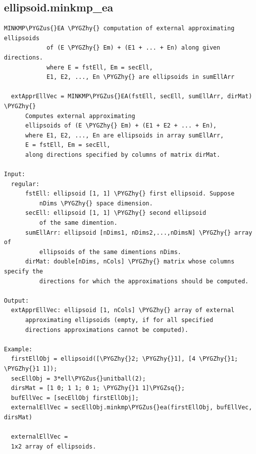 \documentclass[letterpaper,10pt,english]{sphinxmanual}
\def\PYGZus{\char`\_}
\def\PYGZhy{\char`\-}
\def\PYGZsq{\char`\'}
\begin{document}
\subsection{ellipsoid.minkmp\_ea}
\label{chap_functions:ellipsoid-minkmp-ea}
\begin{Verbatim}[commandchars=\\\{\}]
MINKMP\PYGZus{}EA \PYGZhy{} computation of external approximating ellipsoids
            of (E \PYGZhy{} Em) + (E1 + ... + En) along given directions.
            where E = fstEll, Em = secEll,
            E1, E2, ..., En \PYGZhy{} are ellipsoids in sumEllArr

  extApprEllVec = MINKMP\PYGZus{}EA(fstEll, secEll, sumEllArr, dirMat) \PYGZhy{}
      Computes external approximating
      ellipsoids of (E \PYGZhy{} Em) + (E1 + E2 + ... + En),
      where E1, E2, ..., En are ellipsoids in array sumEllArr,
      E = fstEll, Em = secEll,
      along directions specified by columns of matrix dirMat.

Input:
  regular:
      fstEll: ellipsoid [1, 1] \PYGZhy{} first ellipsoid. Suppose
          nDims \PYGZhy{} space dimension.
      secEll: ellipsoid [1, 1] \PYGZhy{} second ellipsoid
          of the same dimention.
      sumEllArr: ellipsoid [nDims1, nDims2,...,nDimsN] \PYGZhy{} array of
          ellipsoids of the same dimentions nDims.
      dirMat: double[nDims, nCols] \PYGZhy{} matrix whose columns specify the
          directions for which the approximations should be computed.

Output:
  extApprEllVec: ellipsoid [1, nCols] \PYGZhy{} array of external
      approximating ellipsoids (empty, if for all specified
      directions approximations cannot be computed).

Example:
  firstEllObj = ellipsoid([\PYGZhy{}2; \PYGZhy{}1], [4 \PYGZhy{}1; \PYGZhy{}1 1]);
  secEllObj = 3*ell\PYGZus{}unitball(2);
  dirsMat = [1 0; 1 1; 0 1; \PYGZhy{}1 1]\PYGZsq{};
  bufEllVec = [secEllObj firstEllObj];
  externalEllVec = secEllObj.minkmp\PYGZus{}ea(firstEllObj, bufEllVec, dirsMat)

  externalEllVec =
  1x2 array of ellipsoids.
\end{Verbatim}
\end{document}
